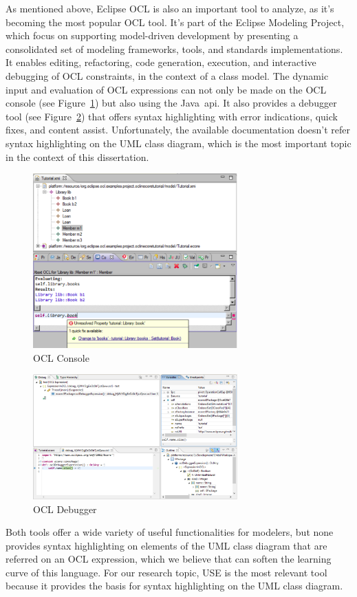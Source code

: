 As mentioned above, Eclipse OCL is also an important tool to analyze, as it's becoming the most popular OCL tool. It's part of the Eclipse Modeling Project, which focus on supporting model-driven development by presenting a consolidated set of modeling frameworks, tools, and standards implementations. It enables editing, refactoring, code generation, execution, and interactive debugging of OCL constraints, in the context of a class model. The dynamic input and evaluation of OCL expressions can not only be made on the OCL console (see Figure~\ref{fig:07_eclipseocl_1}) but also using the Java~\gls{api}. It also provides a debugger tool (see Figure~\ref{fig:07_eclipseocl_2}) that offers syntax highlighting with error indications, quick fixes, and content assist. Unfortunately, the available documentation doesn't refer syntax highlighting on the UML class diagram, which is the most important topic in the context of this dissertation.

\begin{figure}[ht]
\centering
\includegraphics[width=0.7\textwidth]{Chapters/figures/4_RelatedWork/06_eclipseocl_1.png}
\caption{OCL Console~\cite{eclipseocl}}
\label{fig:07_eclipseocl_1}
\end{figure}

\begin{figure}[ht]
\centering
\includegraphics[width=0.7\textwidth]{Chapters/figures/4_RelatedWork/06_eclipseocl_2.png}
\caption{OCL Debugger~\cite{eclipseocl}}
\label{fig:07_eclipseocl_2}
\end{figure}

Both tools offer a wide variety of useful functionalities for modelers, but none provides syntax highlighting on elements of the UML class diagram that are referred on an OCL expression, which we believe that can soften the learning curve of this language. For our research topic, USE is the most relevant tool because it provides the basis for syntax highlighting on the UML class diagram.